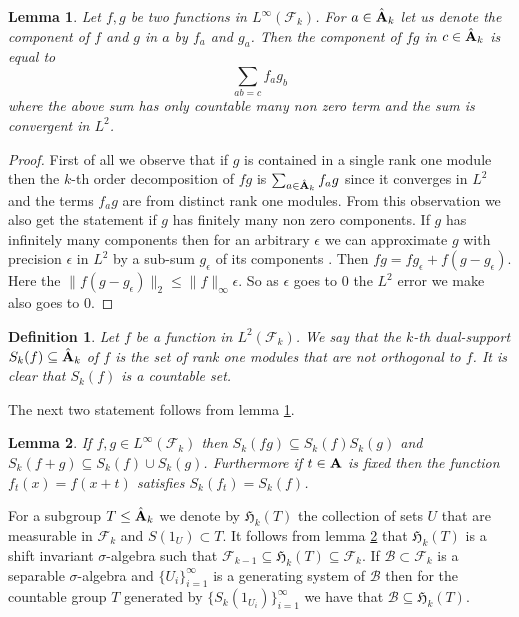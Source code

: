 \documentclass [11pt] {article}
\newtheorem{lemma}{Lemma}[section]
\newtheorem{definition}{Definition}[section]
\def\bA{{\bf A}}
\begin{document}
\medskip

\begin{lemma}\label{highconv} Let $f,g$ be two functions in $L^\infty(\mathcal{F}_k)$. For $a\in\hat{\bA}_k$ let us denote the component of $f$ and $g$ in $a$ by $f_a$ and $g_a$. Then the component of $fg$ in $c\in\hat{\bA}_k$ is equal to
$$\sum_{ab=c}f_ag_b$$
where the above sum has only countable many non zero term and the sum is convergent in $L^2$.
\end{lemma}

\begin{proof} First of all we observe that if $g$ is contained in a single rank one module then
the $k$-th order decomposition of $fg$ is $\sum_{a\in\hat{\bA}_k} f_ag$ since it converges in $L^2$ and the terms $f_ag$ are from distinct rank one modules.
From this observation we also get the statement if $g$ has finitely many non zero components.
If $g$ has infinitely many components then for an arbitrary $\epsilon$ we can approximate $g$ with precision $\epsilon$ in $L^2$ by a sub-sum $g_\epsilon$ of its components . Then $fg=fg_\epsilon+f(g-g_\epsilon)$. Here the $\|f(g-g_\epsilon)\|_2\leq \|f\|_\infty\epsilon$. So as $\epsilon$ goes to $0$ the $L^2$ error we make also goes to $0$.
\end{proof}

\begin{definition} Let $f$ be a function in $L^2(\mathcal{F}_k)$. We say that the $k$-th dual-support $S_k(f)\subseteq\hat{\bA}_k$ of $f$ is the set of rank one modules that are not orthogonal to $f$.
It is clear that $S_k(f)$ is a countable set. 
\end{definition}


The next two statement follows from lemma \ref{highconv}.

\begin{lemma}\label{prodsup} If $f,g\in L^\infty(\mathcal{F}_k)$ then $S_k(fg)\subseteq S_k(f)S_k(g)$ and $S_k(f+g)\subseteq S_k(f)\cup S_k(g)$. Furthermore if $t\in\bA$ is fixed then the function $f_t(x)=f(x+t)$ satisfies $S_k(f_t)=S_k(f)$.
\end{lemma}

For a subgroup $T\leq\hat{\bA}_k$ we denote by $\mathfrak{H}_k(T)$ the collection of sets $U$ that are measurable in $\mathcal{F}_k$ and $S(1_U)\subset T$. It follows from lemma \ref{prodsup} that $\mathfrak{H}_k(T)$ is a shift invariant $\sigma$-algebra such that $\mathcal{F}_{k-1}\subseteq\mathfrak{H}_k(T)\subseteq\mathcal{F}_k$. If $\mathcal{B}\subset\mathcal{F}_k$ is a separable $\sigma$-algebra and $\{U_i\}_{i=1}^\infty$ is a generating system of $\mathcal{B}$ then for the countable group $T$ generated by $\{S_k(1_{U_i})\}_{i=1}^\infty$ we have that $\mathcal{B}\subseteq\mathfrak{H}_k(T)$.
\end{document}
